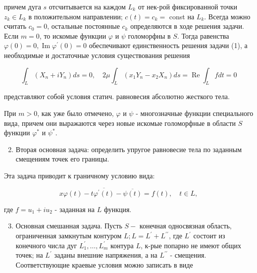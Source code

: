 \documentclass[10pt]{article}
\begin{document}
причем дуга $s$ отсчитывается на каждом $L_{k}$ от нек-рой фиксированной точки $z_{k} \in L_{k}$ в положительном направлении; $c(t)=c_{k}=$ const на $L_{k}$. Всегда можно считать $c_{0}=0$, остальные постоянные $c_{k}$ определяются в ходе решения задачи. Если $m=0$, то искомые функции $\varphi$ и $\psi$ голоморфны в $S$. Тогда равенства $\varphi(0)=0, \operatorname{Im} \varphi^{\prime}(0)=0$ обеспечивают единственность решения задачи (1), а необходимые и достаточные условия существования решения



\[

\int_{L}\left(X_{n}+i Y_{n}\right) d s=0, \quad 2 \mu \int_{L}\left(x_{1} Y_{n}-x_{2} X_{n}\right) d s=\operatorname{Re} \int_{L} f d t=0

\]



представляют собой условия статич. равновесия абсолютно жесткого тела.



При $m>0$, как уже было отмечено, $\varphi$ и $\psi$ - многозначные функции специального вида, причем они выражаются через новые искомые голоморфные в области $S$ функции $\varphi^{*}$ и $\psi^{*}$.



\begin{enumerate}

  \setcounter{enumi}{1}

  \item Вторая основная задача: определить упругое равновесие тела по заданным смещениям точек его границы.

\end{enumerate}



Эта задача приводит к граничному условию вида:



\[

x \varphi(t)-t \overline{\varphi^{\prime}(t)}-\overline{\psi(t)}=f(t), \quad t \in L,

\]



где $f=u_{1}+i u_{2}$ - заданная на $L$ функция.



\begin{enumerate}

  \setcounter{enumi}{2}

  \item Основная смешанная задача. Пусть $S-$ конечная односвязная область, ограниченная замкнутым контуром $L ; L=L^{\prime}+L^{\prime \prime}$, где $L^{\prime}$ состоит из конечного числа дуг $L_{1}^{\prime}, \ldots, L_{m}^{\prime}$ контура $L$, к-рые попарно не имеют общих точек; на $L^{\prime}$ заданы внешние напряжения, а на $L^{\prime \prime}$ - смещения. Соответствующие краевые условия можно записать в виде

\end{enumerate}
\end{document}
